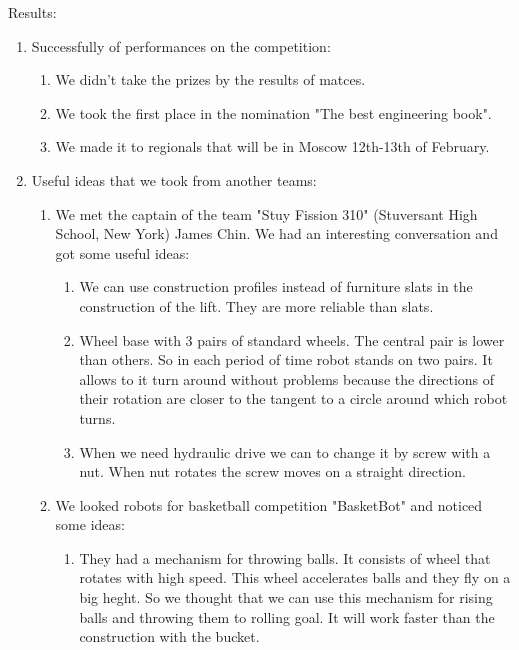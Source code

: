 Results:
\begin{enumerate}
  \item Successfully of performances on the competition:
  \begin{enumerate}
	\item We didn't take the prizes by the results of matces.
	
	\item We took the first place in the nomination "The best engineering book".
	
	\item We made it to regionals that will be in Moscow 12th-13th of February.
	
  \end{enumerate}
  
  \item Useful ideas that we took from another teams:
  \begin{enumerate}
  	
  	\item We met the captain of the team "Stuy Fission 310" (Stuversant High School, New York) James Chin. We had an interesting conversation and got some useful ideas:
  	\begin{enumerate}
  		\item We can use construction profiles instead of furniture slats in the construction of the lift. They are more reliable than slats.
  		
  		\item Wheel base with 3 pairs of standard wheels. The central pair is lower than others. So in each period of time robot stands on two pairs. It allows to it turn around without problems because the directions of their rotation are closer to the tangent to a circle around which robot turns. 
  		
  		\item When we need hydraulic drive we can to change it by screw with a nut. When nut rotates the screw moves on a straight direction.  
  	\end{enumerate}

	
	\item We looked robots for basketball competition "BasketBot" and noticed some ideas:
	\begin{enumerate}
		\item They had a mechanism for throwing balls. It consists of wheel that rotates with high speed. This wheel accelerates balls and they fly on a big heght. So we thought that we can use this mechanism for rising balls and throwing them to rolling goal. It will work faster than the construction with the bucket.  
	\end{enumerate}
	

\end{enumerate}
\end{enumerate}
